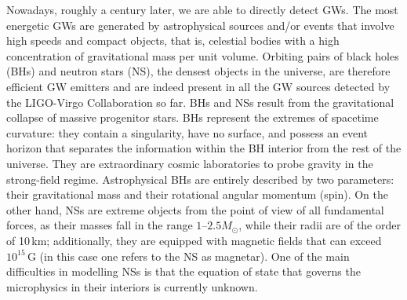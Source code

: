 \documentclass[binding=0.6cm, LaM]{sapthesis}
\begin{document}
	Nowadays, roughly a century later, we are able to directly detect GWs.
	The most energetic GWs are generated by astrophysical sources and/or events that 
	involve high speeds and compact objects, that is, 	
	celestial bodies with a high concentration of gravitational mass per unit volume.
	Orbiting pairs of black holes (BHs) and neutron stars (NS), the densest objects in the universe,
	are therefore efficient GW emitters and are indeed present in all the GW sources 
	detected by the LIGO-Virgo Collaboration so far.
        BHs and NSs result from the gravitational collapse of massive progenitor stars.
        BHs represent the extremes of spacetime curvature:
        they contain a singularity, have no surface, and possess an event horizon that separates the information
        within the BH interior from the rest of the universe.
        They are extraordinary cosmic laboratories to probe gravity in the strong-field regime.
        Astrophysical BHs are entirely described by two parameters: 
	their gravitational mass and their rotational angular momentum (spin).
        On the other hand, NSs are extreme objects from the point of view of all fundamental forces, 
	as their masses fall in the range $1$--$2.5M_\odot$, while their radii are of the order of 10\,km; 
	additionally, they are equipped with magnetic fields that can exceed $10^{15}\,$G 
	(in this case one refers to the NS as magnetar). 
	One of the main difficulties in modelling NSs is that the equation of state that 
	governs the microphysics in their interiors is currently unknown.
\end{document}
